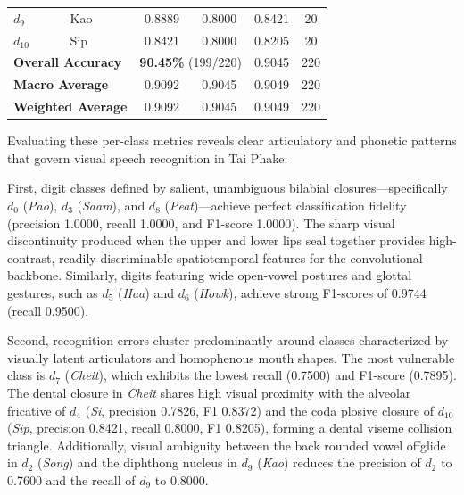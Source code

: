 \documentclass[journal]{IEEEtran}
\begin{document}
\begin{table}[!htbp]
\begin{tabular}{llcccc}
        $d_9$                                         & Kao                                            & 0.8889             & 0.8000          & 0.8421            & 20               \\
        $d_{10}$                                      & Sip                                            & 0.8421             & 0.8000          & 0.8205            & 20               \\
        \hline
        \multicolumn{2}{l}{\textbf{Overall Accuracy}} & \multicolumn{2}{c}{\textbf{90.45\%} (199/220)} & 0.9045             & 220                                                    \\
        \multicolumn{2}{l}{\textbf{Macro Average}}    & 0.9092                                         & 0.9045             & 0.9049          & 220                                  \\
        \multicolumn{2}{l}{\textbf{Weighted Average}} & 0.9092                                         & 0.9045             & 0.9049          & 220                                  \\
        \hline
    \end{tabular}
\end{table}

Evaluating these per-class metrics reveals clear articulatory and phonetic patterns that govern visual speech recognition in Tai Phake:

First, digit classes defined by salient, unambiguous bilabial closures---specifically $d_0$ (\textit{Pao}), $d_3$ (\textit{Saam}), and $d_8$ (\textit{Peat})---achieve perfect classification fidelity (precision 1.0000, recall 1.0000, and F1-score 1.0000). The sharp visual discontinuity produced when the upper and lower lips seal together provides high-contrast, readily discriminable spatiotemporal features for the convolutional backbone. Similarly, digits featuring wide open-vowel postures and glottal gestures, such as $d_5$ (\textit{Haa}) and $d_6$ (\textit{Howk}), achieve strong F1-scores of 0.9744 (recall 0.9500).

Second, recognition errors cluster predominantly around classes characterized by visually latent articulators and homophenous mouth shapes. The most vulnerable class is $d_7$ (\textit{Cheit}), which exhibits the lowest recall (0.7500) and F1-score (0.7895). The dental closure in \textit{Cheit} shares high visual proximity with the alveolar fricative of $d_4$ (\textit{Si}, precision 0.7826, F1 0.8372) and the coda plosive closure of $d_{10}$ (\textit{Sip}, precision 0.8421, recall 0.8000, F1 0.8205), forming a dental viseme collision triangle. Additionally, visual ambiguity between the back rounded vowel offglide in $d_2$ (\textit{Song}) and the diphthong nucleus in $d_9$ (\textit{Kao}) reduces the precision of $d_2$ to 0.7600 and the recall of $d_9$ to 0.8000.
\end{document}
